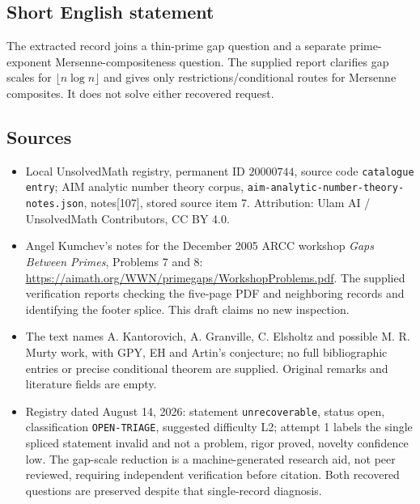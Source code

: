 \documentclass[11pt]{article}
\begin{document}
\subsection{Short English statement}
The extracted record joins a thin-prime gap question and a separate prime-exponent Mersenne-compositeness question. The supplied report clarifies gap scales for \(\lfloor n\log n\rfloor\) and gives only restrictions/conditional routes for Mersenne composites. It does not solve either recovered request.
\subsection{Sources}
\begin{itemize}
\item Local UnsolvedMath registry, permanent ID \(20000744\), source code \texttt{catalogue entry}; AIM analytic number theory corpus, \texttt{aim-analytic-number-theory-notes.json}, notes[107], stored source item 7. Attribution: Ulam AI / UnsolvedMath Contributors, CC BY 4.0.
\item Angel Kumchev's notes for the December 2005 ARCC workshop \emph{Gaps Between Primes}, Problems 7 and 8: \url{https://aimath.org/WWN/primegaps/WorkshopProblems.pdf}. The supplied verification reports checking the five-page PDF and neighboring records and identifying the footer splice. This draft claims no new inspection.
\item The text names A. Kantorovich, A. Granville, C. Elsholtz and possible M. R. Murty work, with GPY, EH and Artin's conjecture; no full bibliographic entries or precise conditional theorem are supplied. Original remarks and literature fields are empty.
\item Registry dated August 14, 2026: statement \texttt{unrecoverable}, status open, classification \texttt{OPEN-TRIAGE}, suggested difficulty L2; attempt 1 labels the single spliced statement invalid and not a problem, rigor proved, novelty confidence low. The gap-scale reduction is a machine-generated research aid, not peer reviewed, requiring independent verification before citation. Both recovered questions are preserved despite that single-record diagnosis.
\end{itemize}
\end{document}

